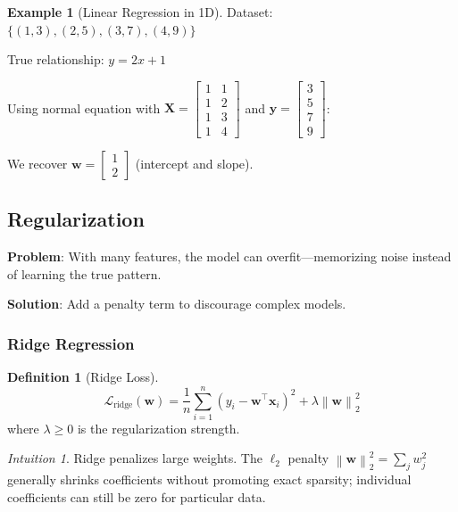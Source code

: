 \documentclass[11pt,twoside]{article}
\numberwithin{equation}{section}
\newcommand{\vect}[1]{\bm{#1}}
\newcommand{\mat}[1]{\bm{#1}}
\newcommand{\norm}[1]{\left\lVert#1\right\rVert}
\newcommand{\Loss}{\mathcal{L}}
\theoremstyle{plain}
\theoremstyle{definition}
\newtheorem{definition}[theorem]{Definition}
\newtheorem{example}[theorem]{Example}
\theoremstyle{remark}
\newtheorem{intuition}[theorem]{Intuition}
\begin{document}
\begin{example}[Linear Regression in 1D]
Dataset: $\{(1, 3), (2, 5), (3, 7), (4, 9)\}$

True relationship: $y = 2x + 1$

Using normal equation with $\mat{X} = \begin{bmatrix} 1 & 1 \\ 1 & 2 \\ 1 & 3 \\ 1 & 4 \end{bmatrix}$ and $\vect{y} = \begin{bmatrix} 3 \\ 5 \\ 7 \\ 9 \end{bmatrix}$:

We recover $\vect{w} = \begin{bmatrix} 1 \\ 2 \end{bmatrix}$ (intercept and slope).
\end{example}

\subsection{Regularization}

\textbf{Problem}: With many features, the model can overfit---memorizing noise instead of learning the true pattern.

\textbf{Solution}: Add a penalty term to discourage complex models.

\subsubsection{Ridge Regression}

\begin{definition}[Ridge Loss]
\[
\Loss_{\text{ridge}}(\vect{w}) = \frac{1}{n}\sum_{i=1}^n (y_i - \vect{w}^\top\vect{x}_i)^2 + \lambda \norm{\vect{w}}_2^2
\]
where $\lambda \geq 0$ is the regularization strength.
\end{definition}

\begin{intuition}
Ridge penalizes large weights. The $\ell_2$ penalty $\norm{\vect{w}}_2^2 = \sum_j w_j^2$ generally shrinks coefficients without promoting exact sparsity; individual coefficients can still be zero for particular data.
\end{intuition}
\end{document}
